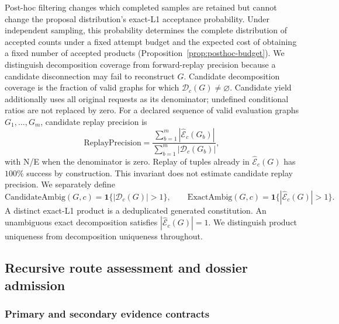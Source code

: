 Post-hoc filtering changes which completed samples are retained but cannot change the proposal
distribution's exact-L1 acceptance probability.
Under independent sampling, this probability determines the complete distribution of accepted
counts under a fixed attempt budget and the expected cost of obtaining a fixed number of accepted
products (Proposition~\ref{prop:posthoc-budget}).
We distinguish decomposition coverage from forward-replay precision because a candidate disconnection
may fail to reconstruct $G$.
Candidate decomposition coverage is the fraction of valid graphs for which
$\mathcal D_c(G)\neq\varnothing$. Candidate yield additionally uses all original requests as
its denominator; undefined conditional ratios are not replaced by zero. For a declared sequence of valid evaluation graphs $G_1,\ldots,G_m$, candidate replay precision is
\begin{equation}
 \mathrm{ReplayPrecision}
 =\frac{\sum_{b=1}^m|\widehat{\mathcal E}_c(G_b)|}
 {\sum_{b=1}^m|\mathcal D_c(G_b)|},
\end{equation}
with N/E when the denominator is zero. Replay of tuples already in
$\widehat{\mathcal E}_c(G)$ has $100\%$ success by construction. This invariant does not estimate
candidate replay precision. We separately define
\begin{equation}
 \mathrm{CandidateAmbig}(G,c)=\mathbf 1\{|\mathcal D_c(G)|>1\},\qquad
 \mathrm{ExactAmbig}(G,c)=\mathbf 1\{|\widehat{\mathcal E}_c(G)|>1\}.
\end{equation}
A distinct exact-L1 product is a deduplicated generated constitution. An unambiguous exact
decomposition satisfies $|\widehat{\mathcal E}_c(G)|=1$. We distinguish product uniqueness from
decomposition uniqueness throughout.

\subsection{Recursive route assessment and dossier admission}
\label{app:route-assessment}

\subsubsection{Primary and secondary evidence contracts}

